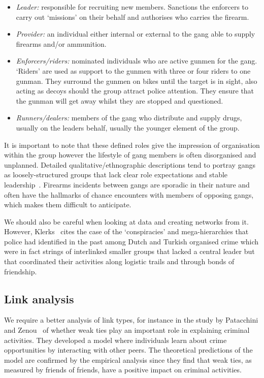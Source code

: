 \documentclass[conference]{IEEEtran}
\theoremstyle{definition}
\begin{document}
\begin{itemize}
\item \emph{Leader:} responsible for recruiting new members.
Sanctions the enforcers to carry out `missions' on their behalf and
authorises who carries the firearm.
\item \emph{Provider:} an individual either internal or external to
the gang able to supply firearms and/or ammunition.
\item \emph{Enforcers/riders:} nominated individuals who are active
gunmen for the gang. `Riders' are used as support to the gunmen with
three or four riders to one gunman.  They surround the gunmen on bikes
until the target is in sight, also acting as decoys should the group
attract police attention. They ensure that the gunman will get away
whilst they are stopped and questioned.
\item \emph{Runners/dealers:} members of the gang who distribute and
supply drugs, usually on the leaders behalf, usually the younger
element of the group.
\end{itemize}
  
It is important to note that these defined roles give the impression
of organisation within the group however the lifestyle of gang members
is often disorganised and unplanned. Detailed qualitative/ethnographic
descriptions tend to portray gangs as loosely-structured groups that
lack clear role expectations and stable
leadership~\cite{hughes:2005}. Firearms incidents between gangs are
sporadic in their nature and often have the hallmarks of chance
encounters with members of opposing gangs, which makes them difficult
to anticipate.

We should also be careful when looking at data and creating networks
from it. However, Klerks~\cite{Klerks2001} cites the case of the
`conspiracies' and mega-hierarchies that police had identified in the
past among Dutch and Turkish organised crime which were in fact
strings of interlinked smaller groups that lacked a central leader but
that coordinated their activities along logistic trails and through
bonds of friendship.


\subsection{Link analysis}
We require a better analysis of link types, for instance in the study
by Patacchini and Zenou~\cite{PatacchiniZenou2008} of whether weak
ties play an important role in explaining criminal activities. They
developed a model where individuals learn about crime opportunities by
interacting with other peers. The theoretical predictions of the model
are confirmed by the empirical analysis since they find that weak
ties, as measured by friends of friends, have a positive impact on
criminal activities.
\end{document}
